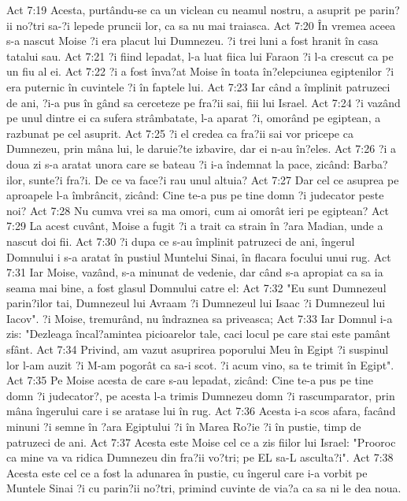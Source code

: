 Act 7:19  Acesta, purtându-se ca un viclean cu neamul nostru, a asuprit pe parin?ii no?tri sa-?i lepede pruncii lor, ca sa nu mai traiasca.
Act 7:20  În vremea aceea s-a nascut Moise ?i era placut lui Dumnezeu. ?i trei luni a fost hranit în casa tatalui sau.
Act 7:21  ?i fiind lepadat, l-a luat fiica lui Faraon ?i l-a crescut ca pe un fiu al ei.
Act 7:22  ?i a fost înva?at Moise în toata în?elepciunea egiptenilor ?i era puternic în cuvintele ?i în faptele lui.
Act 7:23  Iar când a împlinit patruzeci de ani, ?i-a pus în gând sa cerceteze pe fra?ii sai, fiii lui Israel.
Act 7:24  ?i vazând pe unul dintre ei ca sufera strâmbatate, l-a aparat ?i, omorând pe egiptean, a razbunat pe cel asuprit.
Act 7:25  ?i el credea ca fra?ii sai vor pricepe ca Dumnezeu, prin mâna lui, le daruie?te izbavire, dar ei n-au în?eles.
Act 7:26  ?i a doua zi s-a aratat unora care se bateau ?i i-a îndemnat la pace, zicând: Barba?ilor, sunte?i fra?i. De ce va face?i rau unul altuia?
Act 7:27  Dar cel ce asuprea pe aproapele l-a îmbrâncit, zicând: Cine te-a pus pe tine domn ?i judecator peste noi?
Act 7:28  Nu cumva vrei sa ma omori, cum ai omorât ieri pe egiptean?
Act 7:29  La acest cuvânt, Moise a fugit ?i a trait ca strain în ?ara Madian, unde a nascut doi fii.
Act 7:30  ?i dupa ce s-au împlinit patruzeci de ani, îngerul Domnului i s-a aratat în pustiul Muntelui Sinai, în flacara focului unui rug.
Act 7:31  Iar Moise, vazând, s-a minunat de vedenie, dar când s-a apropiat ca sa ia seama mai bine, a fost glasul Domnului catre el:
Act 7:32  "Eu sunt Dumnezeul parin?ilor tai, Dumnezeul lui Avraam ?i Dumnezeul lui Isaac ?i Dumnezeul lui Iacov". ?i Moise, tremurând, nu îndraznea sa priveasca;
Act 7:33  Iar Domnul i-a zis: "Dezleaga încal?amintea picioarelor tale, caci locul pe care stai este pamânt sfânt.
Act 7:34  Privind, am vazut asuprirea poporului Meu în Egipt ?i suspinul lor l-am auzit ?i M-am pogorât ca sa-i scot. ?i acum vino, sa te trimit în Egipt".
Act 7:35  Pe Moise acesta de care s-au lepadat, zicând: Cine te-a pus pe tine domn ?i judecator?, pe acesta l-a trimis Dumnezeu domn ?i rascumparator, prin mâna îngerului care i se aratase lui în rug.
Act 7:36  Acesta i-a scos afara, facând minuni ?i semne în ?ara Egiptului ?i în Marea Ro?ie ?i în pustie, timp de patruzeci de ani.
Act 7:37  Acesta este Moise cel ce a zis fiilor lui Israel: "Prooroc ca mine va va ridica Dumnezeu din fra?ii vo?tri; pe EL sa-L asculta?i".
Act 7:38  Acesta este cel ce a fost la adunarea în pustie, cu îngerul care i-a vorbit pe Muntele Sinai ?i cu parin?ii no?tri, primind cuvinte de via?a ca sa ni le dea noua.
